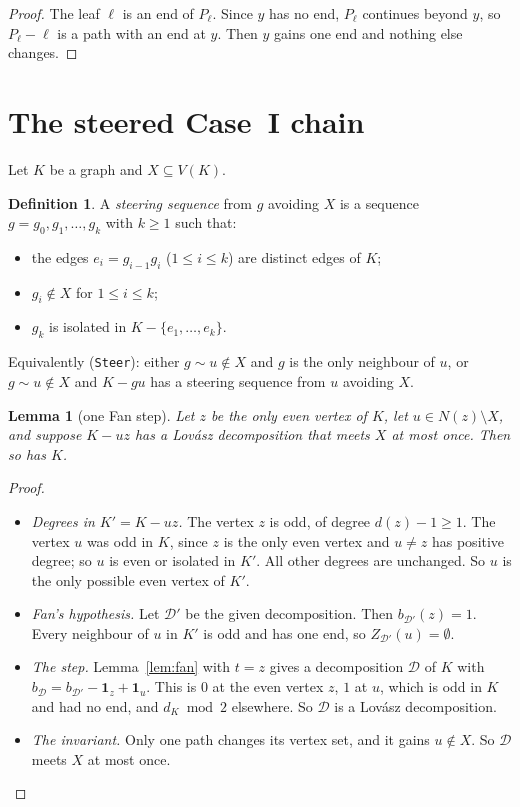 \documentclass[11pt]{amsart}
\newtheorem{lemma}[theorem]{Lemma}
\theoremstyle{definition}
\newtheorem{definition}[theorem]{Definition}
\newcommand{\cD}{\mathcal D}
\newcommand{\lean}[1]{\quad{\footnotesize[Lean: \texttt{#1}]}}
\begin{document}
\begin{proof}
The leaf $\ell$ is an end of $P_\ell$. Since $y$ has no end, $P_\ell$ continues beyond $y$, so $P_\ell-\ell$
is a path with an end at $y$. Then $y$ gains one end and nothing else changes.
\end{proof}

\section{The steered Case~I chain}\label{sec:steer}

Let $K$ be a graph and $X\subseteq V(K)$.

\begin{definition}\label{def:steer}
A \emph{steering sequence} from $g$ avoiding $X$ is a sequence $g=g_0,g_1,\dots,g_k$ with $k\ge1$ such
that:
\begin{itemize}
\item the edges $e_i=g_{i-1}g_i$ ($1\le i\le k$) are distinct edges of $K$;
\item $g_i\notin X$ for $1\le i\le k$;
\item $g_k$ is isolated in $K-\{e_1,\dots,e_k\}$.
\end{itemize}
Equivalently (\texttt{Steer}): either $g\sim u\notin X$ and $g$ is the only neighbour of $u$, or $g\sim
u\notin X$ and $K-gu$ has a steering sequence from $u$ avoiding $X$.
\lean{Steer}
\end{definition}

\begin{lemma}[one Fan step]\label{lem:step}
Let $z$ be the only even vertex of $K$, let $u\in N(z)\setminus X$, and suppose $K-uz$ has a Lov\'asz
decomposition that meets $X$ at most once. Then so has $K$.
\lean{fan\_step\_meetsOnce}
\end{lemma}

\begin{proof}
\begin{itemize}
\item \emph{Degrees in $K'=K-uz$.} The vertex $z$ is odd, of degree $d(z)-1\ge1$. The vertex $u$ was odd
in $K$, since $z$ is the only even vertex and $u\ne z$ has positive degree; so $u$ is even or isolated
in $K'$. All other degrees are unchanged. So $u$ is the only possible even vertex of $K'$.
\item \emph{Fan's hypothesis.} Let $\cD'$ be the given decomposition. Then $b_{\cD'}(z)=1$. Every
neighbour of $u$ in $K'$ is odd and has one end, so $Z_{\cD'}(u)=\emptyset$.
\item \emph{The step.} Lemma~\ref{lem:fan} with $t=z$ gives a decomposition $\cD$ of $K$ with $b_\cD=
b_{\cD'}-\mathbf 1_z+\mathbf 1_u$. This is $0$ at the even vertex $z$, $1$ at $u$, which is odd in
$K$ and had no end, and $d_K\bmod2$ elsewhere. So $\cD$ is a Lov\'asz decomposition.
\item \emph{The invariant.} Only one path changes its vertex set, and it gains $u\notin X$. So $\cD$
meets $X$ at most once.\qedhere
\end{itemize}
\end{proof}
\end{document}
